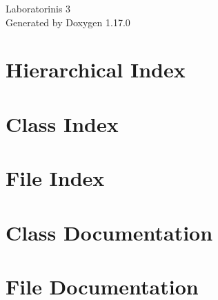 \documentclass[twoside]{book}
\newcommand{\+}{\discretionary{\mbox{\scriptsize$\hookleftarrow$}}{}{}}
\newcommand{\clearemptydoublepage}{%
    \newpage{\pagestyle{empty}\cleardoublepage}%
  }
\begin{document}
  \raggedbottom
    \hypersetup{pageanchor=false,
                bookmarksnumbered=true,
                pdfencoding=unicode
               }
  \begin{titlepage}
  \vspace*{7cm}
  \begin{center}%
  {\Large Laboratorinis 3}\\
  \vspace*{1cm}
  {\large Generated by Doxygen 1.17.0}\\
  \end{center}
  \end{titlepage}
  \clearemptydoublepage
  \tableofcontents
  \clearemptydoublepage
  \hypersetup{pageanchor=true}

\chapter{Hierarchical Index}

\chapter{Class Index}

\chapter{File Index}

\chapter{Class Documentation}




\chapter{File Documentation}



















  \backmatter
  \newpage
  \clearemptydoublepage
  \printindex
\end{document}
